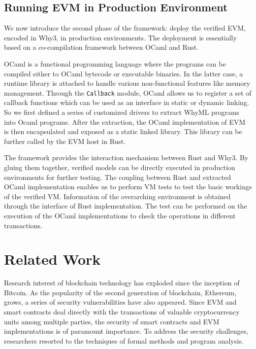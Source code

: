 \documentclass[runningheads]{llncs}
\begin{document}
\subsection{Running EVM in Production Environment}
We now introduce the second phase of the framework: deploy the verified EVM, encoded in Why3, in production environments. The deployment is essentially based on a co-compilation framework between OCaml and Rust.

OCaml is a functional programming language where the programs can be compiled either to OCaml bytecode or executable binaries. In the latter case, a runtime library is attached to handle various non-functional features like memory management. Through the \texttt{Callback} module, OCaml allows us to register a set of callback functions which can be used as an interface in static or dynamic linking. 
So we first defined a series of customized drivers to extract WhyML programs into Ocaml programs. After the extraction, the OCaml implementation of EVM is then encapsulated and exposed as a static linked library. This library can be further called by the EVM host in Rust.

The framework provides the interaction mechanism between Rust and Why3. By gluing them together, verified models can be directly executed in production environments for further testing. The coupling between Rust and extracted OCaml implementation enables us to perform VM tests to test the basic workings of the verified VM. Information of the overarching environment is obtained through the interface of Rust implementation. The test can be performed on the execution of the OCaml implementations to check the operations in different transactions.    


\section{Related Work}\label{Sec: Related}
Research interest of blockchain technology has exploded since the inception of Bitcoin. As the popularity of the second generation of blockchain, Ethereum, grows, a series of security vulnerabilities have also appeared. Since EVM and smart contracts deal directly with the transactions of valuable cryptocurrency units among multiple parties, the security of smart contracts and EVM implementations is of paramount importance. To address the security challenges, researchers resorted to the techniques of formal methods and program analysis. 
\end{document}
